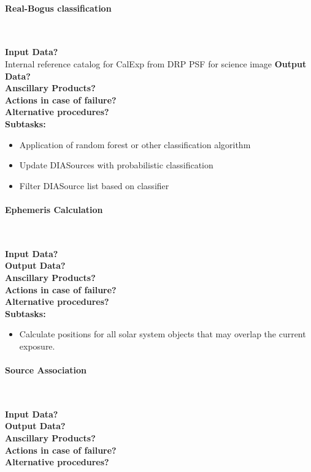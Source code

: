 \paragraph{Real-Bogus classification}~

\noindent
{\bf Input Data?}\\
Internal reference catalog for CalExp from DRP 
PSF for science image
{\bf Output Data?}\\
{\bf Anscillary Products?}\\
{\bf Actions in case of failure?}\\
{\bf Alternative procedures?}\\

\noindent
{\bf Subtasks:}
\begin{itemize}
\item Application of random forest or other classification algorithm
\item Update DIASources with probabilistic classification 
\item Filter DIASource list based on classifier
\end{itemize}


\paragraph{Ephemeris Calculation}~

\noindent
{\bf Input Data?}\\
{\bf Output Data?}\\
{\bf Anscillary Products?}\\
{\bf Actions in case of failure?}\\
{\bf Alternative procedures?}\\

\noindent
{\bf Subtasks:}
\begin{itemize}
\item Calculate positions for all solar system objects that may overlap the current exposure.
\end{itemize}

\paragraph{Source Association}~

\noindent
{\bf Input Data?}\\
{\bf Output Data?}\\
{\bf Anscillary Products?}\\
{\bf Actions in case of failure?}\\
{\bf Alternative procedures?}\\

